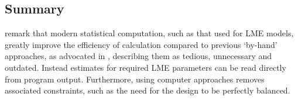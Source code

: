 \documentclass[12pt, a4paper]{report}
\theoremstyle{plain}
\theoremstyle{definition}
\theoremstyle{remark}
\begin{document}
\subsection{Summary}	
\citet{BXC2008} remark that modern statistical computation, such as that used for LME models, greatly improve the efficiency of calculation compared to previous `by-hand' approaches, as advocated in \citet{BA99}, describing them as tedious, unnecessary and outdated. Instead estimates for required LME parameters can be read directly from program output. Furthermore, using computer approaches removes associated constraints, such as the need for the design to be perfectly balanced.









\end{document}
